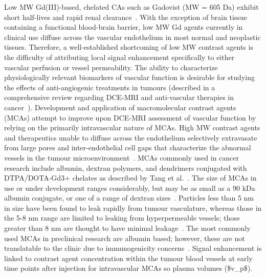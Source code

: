 Low \acs{MW} Gd(III)-based, chelated \acs{CA}s such as Gadovist (\acs{MW} = 605 \acs{Da}) exhibit short half-lives and rapid renal clearance~\cite{Weinmann:1984gv}.
With the exception of brain tissue containing a functional blood-brain barrier, low \acs{MW} Gd agents currently in clinical use diffuse across the vascular endothelium in most normal and neoplastic tissues.
Therefore, a well-established shortcoming of low \acs{MW} contrast agents is the difficulty of attributing local signal enhancement specifically to either vascular perfusion or vessel permeability.
The ability to characterize physiologically relevant biomarkers of vascular function is desirable for studying the effects of anti-angiogenic treatments in tumours (described in a comprehensive review regarding DCE-MRI and anti-vascular therapies in cancer~\cite{OConnor:2012ie}).
Development and application of macromolecular contrast agents (\acs{MCA}s) attempt to improve upon DCE-MRI assessment of vascular function by relying on the primarily intravascular nature of \acs{MCA}s.
High \acs{MW} contrast agents and therapeutics unable to diffuse across the endothelium selectively extravasate from large pores and inter-endothelial cell gaps that characterize the abnormal vessels in the tumour microenvironment~\cite{McDonald:2002ut,Hashizume:2000bq}.
\acs{MCA}s commonly used in cancer research include albumin, dextran polymers, and dendrimers conjugated with DTPA/DOTA-Gd3+ chelates as described by Tang et al.~\cite{Tang:2013fi}.
The size of \acs{MCA}s in use or under development ranges considerably, but may be as small as a 90 \acs{kDa} albumin conjugate, or one of a range of dextran sizes~\cite{Barrett:2006jx}.
Particles less than 5 nm in size have been found to leak rapidly from tumour vasculature, whereas those in the 5-8 nm range are limited to leaking from hyperpermeable vessels; those greater than 8 nm are thought to have minimal leakage~\cite{Kobayashi:2004vq,Sato:2001tt}.
The most commonly used \acs{MCA}s in preclinical research are albumin based; however, these are not translatable to the clinic due to immunogenicity concerns~\cite{Ogan:1987tg}.
Signal enhancement is linked to contrast agent concentration within the tumour blood vessels at early time points after injection for intravascular \acs{MCA}s so plasma volumes (\acs{$v_p$}).
